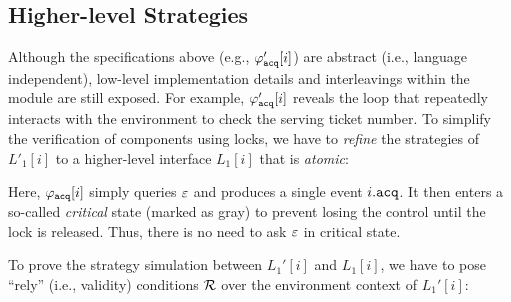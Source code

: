 \subsection{Higher-level Strategies}

 Although the specifications above (e.g., $\varphi_{{\mathrm{\texttt{acq}}}}'[i]$) are abstract (i.e., language independent),
low-level implementation details and interleavings within the module are still exposed.
For example, $\varphi_{{\mathrm{\texttt{acq}}}}'[i]$ reveals the loop that repeatedly interacts with the environment to check the serving ticket number.
To simplify the verification of components using locks, we have to \emph{refine} the strategies of $L'_1[i]$ to a higher-level interface $L_1[i]$ that is \emph{atomic}:%
\begin{center}
\end{center}
Here, $\varphi_{{\mathrm{\texttt{acq}}}}[i]$ simply queries $\oracle$
and produces a single event $i.{\mathrm{\texttt{acq}}}$. It then enters  a so-called
\emph{critical} state (marked as gray) to prevent losing the control until  the lock is released. Thus, there is no need to  ask $\oracle$ in critical state. 

To prove the strategy simulation between $L_1'[i]$ and $L_1[i]$, we have to  pose ``rely'' (i.e.,
validity) conditions $\mathcal{R}$ over the environment context of $L_1'[i]$:

